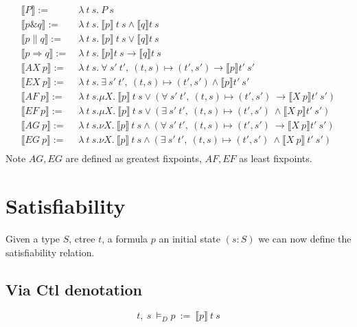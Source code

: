 \documentclass[10pt]{acmart}
\begin{document}
\begin{align*}
  \llbracket P \rrbracket := &\ \lambda\ t\ s.\ P\ s \\
  \llbracket p \& q \rrbracket := &\ \lambda\ t\ s.\ \llbracket p \rrbracket\  t\ s \land \llbracket q \rrbracket t\ s \\
  \llbracket p \| q \rrbracket := &\ \lambda\ t\ s.\ \llbracket p \rrbracket\ t\ s \lor \llbracket q \rrbracket t\ s \\
  \llbracket p \Rightarrow q \rrbracket := &\ \lambda\ t\ s.\ \llbracket p \rrbracket t\ s \to \llbracket q \rrbracket t\ s \\
  \llbracket AX\ p \rrbracket := &\ \lambda\ t\ s.\ \forall\ s'\ t',\ (t,s) \mapsto (t',s') \to \llbracket p \rrbracket t'\ s' \\
  \llbracket EX\ p \rrbracket := &\ \lambda\ t\ s.\ \exists\ s'\ t',\ (t,s) \mapsto (t',s') \land \llbracket p \rrbracket t'\ s' \\
  \llbracket AF\ p \rrbracket := &\ \lambda\ t\ s.\mu X. \ \llbracket p \rrbracket\ t\ s \lor
            (\forall\ s'\ t',\ (t,s) \mapsto (t',s') \ \to \llbracket X\ p \rrbracket t'\ s') \\
  \llbracket EF\ p \rrbracket := &\ \lambda\ t\ s.\mu X. \ \llbracket p \rrbracket\ t\ s \lor
            (\exists\ s'\ t',\ (t,s) \mapsto (t',s') \ \land \llbracket X\ p \rrbracket t'\ s') \\
  \llbracket AG\ p \rrbracket := &\ \lambda\ t\ s.\nu X. \ \llbracket p \rrbracket\ t\ s \land
            (\forall\ s'\ t',\ (t,s) \mapsto (t',s') \ \to \llbracket X\ p \rrbracket t'\ s') \\
  \llbracket EG\ p \rrbracket := &\ \lambda\ t\ s.\nu X. \ \llbracket p \rrbracket\ t\ s \land
            (\exists\ s'\ t',\ (t,s) \mapsto (t',s') \ \land \llbracket X\ p \rrbracket\ t'\ s') \\
\end{align*}
Note $AG, EG$ are defined as greatest fixpoints, $AF, EF$ as least fixpoints.

\section*{Satisfiability}
Given a type $S$, ctree $t$, a formula $p$ an initial state $(s: S)$ we can now define the satisfiability relation.

\subsection*{Via Ctl denotation}
$$t,\ s\ \vDash_D p\ :=\ \llbracket p \rrbracket\ t\ s$$
\end{document}

